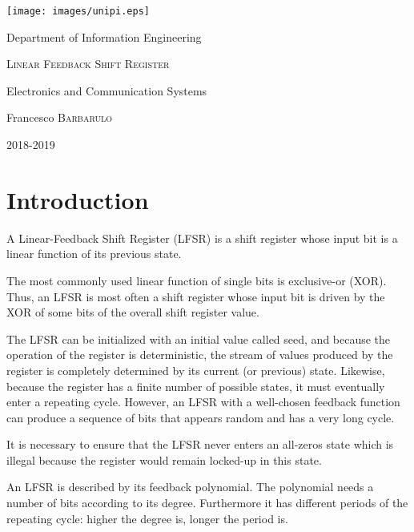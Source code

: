 \documentclass[11pt,a4paper,oneside, openright]{article}
\begin{document}
{
  \begin{titlepage}
  	\centering
  	\texttt{[image: images/unipi.eps]}\par
  	\vspace{1cm}
    {\Large Department of Information Engineering \par}
  	\vspace{2cm}
  	{\huge\textsc{Linear Feedback Shift Register}\par}
    \vspace{0.5cm}
  	{\Large Electronics and Communication Systems\par}
  	\vspace{2cm}
  	{\Large Francesco \textsc{Barbarulo}\par}

  	\vfill

  	{\large 2018-2019\par}
  \end{titlepage}
}


\tableofcontents

\newpage

\section{Introduction}
A Linear-Feedback Shift Register (LFSR) is a shift register whose input bit is a linear function of its previous state.

The most commonly used linear function of single bits is exclusive-or (XOR). Thus, an LFSR is most often a shift register whose input bit is driven by the XOR of some bits of the overall shift register value.

The LFSR can be initialized with an initial value called seed, and because the operation of the register is deterministic, the stream of values produced by the register is completely determined by its current (or previous) state. Likewise, because the register has a finite number of possible states, it must eventually enter a repeating cycle. However, an LFSR with a well-chosen feedback function can produce a sequence of bits that appears random and has a very long cycle.

It is necessary to ensure that the LFSR never enters an all-zeros state which is illegal because the register would remain locked-up in this state.

An LFSR is described by its feedback polynomial. The polynomial needs a number of bits according to its degree. Furthermore it has different periods of the repeating cycle: higher the degree is, longer the period is.
\end{document}
